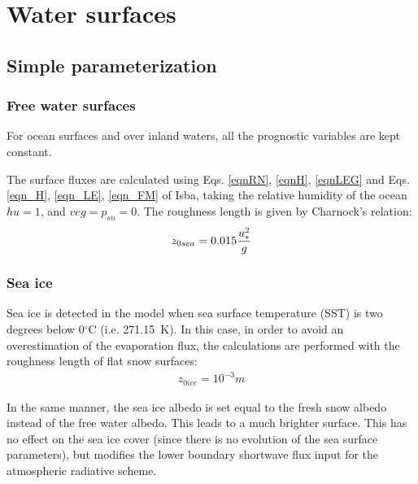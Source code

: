 
\chapter{Water surfaces}
\minitoc


\section{Simple parameterization}

\subsection{Free water surfaces}

For ocean surfaces and over inland waters,
all the prognostic variables are kept constant.

The surface fluxes are calculated using Eqs. \ref{eqnRN}, \ref{eqnH},
\ref{eqnLEG} and
Eqs. \ref{eqn_H}, \ref{eqn_LE}, \ref{eqn_FM} of Isba,
taking the relative humidity of the ocean $hu=1$, and
$veg=p_{sn}=0$.
The roughness length is given by Charnock's relation:
\begin{eqnarray}
z_{0sea} = 0.015 {u^2_* \over g}
\end{eqnarray}

\subsection{Sea ice}

Sea ice is detected in the model when sea surface temperature (SST) is
two degrees below 0$^\circ$C (i.e. 271.15~K). In this case, in order
to avoid an overestimation of the evaporation flux, the calculations
are performed with the roughness length of flat snow surfaces:
\begin{eqnarray}
z_{0ice} = 10^{-3} m
\end{eqnarray}

In the same manner, the sea ice albedo is set equal to the fresh snow
albedo instead of the free water albedo. This leads to a much brighter
surface. This has no effect on the sea ice cover (since there is no evolution
of the sea surface parameters), but modifies the lower boundary shortwave flux
input for the atmospheric radiative scheme.

